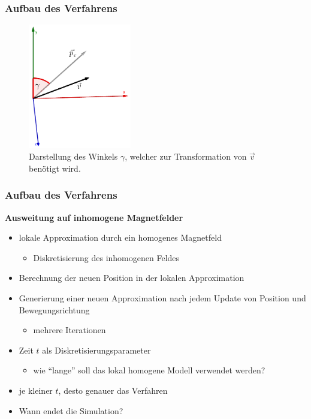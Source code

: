 \begin{frame}
  \frametitle{Aufbau des Verfahrens}
  \begin{figure}
    \centering
    \includegraphics[width=0.4\textwidth]{../geogebra/img/winkel_v_edited}
    \caption{Darstellung des Winkels \(\gamma\), welcher zur Transformation von \(\vec{v}\) ben\"otigt wird.}
    \label{fig:winkelv}
  \end{figure}
\end{frame}

\begin{frame}
  \frametitle{Aufbau des Verfahrens}
  \textbf{Ausweitung auf inhomogene Magnetfelder}
  \begin{itemize}
    \item lokale Approximation durch ein homogenes Magnetfeld
      \begin{itemize}
        \item Diskretisierung des inhomogenen Feldes
      \end{itemize}
    \item Berechnung der neuen Position in der lokalen Approximation
    \item Generierung einer neuen Approximation nach jedem Update von Position und Bewegungsrichtung
      \begin{itemize}
        \item mehrere Iterationen
      \end{itemize}
    \item Zeit \(t\) als Diskretisierungsparameter
      \begin{itemize}
        \item wie "`lange"' soll das lokal homogene Modell verwendet werden?
      \end{itemize}
    \item je kleiner \(t\), desto genauer das Verfahren
    \item Wann endet die Simulation?
  \end{itemize}
\end{frame}

